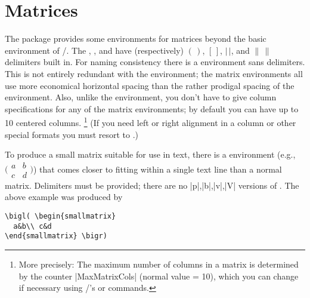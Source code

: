 \documentclass[leqno,titlepage,openany]{amsldoc}
\begin{document}
\section{Matrices}\label{ss:matrix}

The  package provides some environments for
matrices beyond the basic  environment of
\latex/. The , ,  and
 have (respectively) $(\,)$, $[\,]$, $\lvert\,\rvert$, and
$\lVert\,\rVert$ delimiters built in. For naming consistency there is a
 environment sans delimiters. This is not entirely redundant
with the  environment; the matrix environments all use more
economical horizontal spacing than the rather prodigal spacing of the
 environment. Also, unlike the  environment, you
don't have to give column specifications for any of the matrix
environments; by default you can have up to 10 centered columns.%
\footnote{%
More precisely: The maximum number of columns in a matrix is determined
by the counter |MaxMatrixCols| (normal value = 10), which you can change
if necessary using \latex/'s  or 
commands.%
}\space%
(If you need left or right alignment in a column or other special
formats you must resort to .)

To produce a small matrix suitable for use in text, there is a
 environment (e.g.,
\begin{math}
\bigl( \begin{smallmatrix}
  a&b\\ c&d
\end{smallmatrix} \bigr)
\end{math})
that comes closer to fitting within a single text line than a normal
matrix. Delimiters must be provided; there are no |p|,|b|,|v|,|V|
versions of . The above example was produced by
\begin{verbatim}
\bigl( \begin{smallmatrix}
  a&b\\ c&d
\end{smallmatrix} \bigr)
\end{verbatim}
\end{document}

